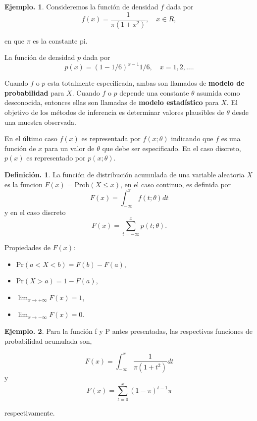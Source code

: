 \documentclass[]{book}
\providecommand{\tightlist}{%
  \setlength{\itemsep}{0pt}\setlength{\parskip}{0pt}}
\theoremstyle{definition}
\newtheorem{definition}{Definición.}[chapter]
\theoremstyle{definition}
\newtheorem{example}{Ejemplo.}[chapter]
\theoremstyle{definition}
\theoremstyle{remark}
\begin{document}
\begin{example}
\protect\hypertarget{exm:unnamed-chunk-104}{}{\label{exm:unnamed-chunk-104} }
Consideremos la función de densidad \(f\) dada por
\[f(x)= \frac{1}{\pi(1+x^2)}, \quad x\in R, \]

en que \(\pi\) es la constante pi.

La función de densidad \(p\) dada por
\[p(x)=(1-1/6)^{x-1}1/6, \quad x=1,2,\ldots. \]
\end{example}

Cuando \(f\) o \(p\) esta totalmente especificada, ambas son
llamados de \textbf{modelo de probabilidad} para \(X\). Cuando \(f\) o
\(p\) depende una constante \(\theta\) asumida como
desconocida, entonces ellas son llamadas de \textbf{modelo
estadístico} para \(X\). El objetivo de los métodos de
inferencia es determinar valores plausibles de \(\theta\)
desde una muestra observada.

En el último caso \(f(x)\) es representada por
\(f(x;\theta)\) indicando que \(f\) es una función de \(x\)
para un valor de \(\theta\) que debe ser especificado. En el
caso discreto, \(p(x)\) es representado por \(p(x;\theta)\).

\begin{definition}
\protect\hypertarget{def:unnamed-chunk-105}{}{\label{def:unnamed-chunk-105} }
La función de distribución acumulada de una variable
aleatoria \(X\) es la funcion \(F(x)= \mbox{Prob}(X\leq x)\), en
el caso
continuo, es definida por
\[ F(x)= \int_{-\infty}^x f(t;\theta)dt \]
y en el caso discreto
\[ F(x)=\sum_{t=-\infty}^{x}p(t;\theta).\]

Propiedades de \(F(x)\):

\begin{itemize}
\tightlist
\item
  Pr\((a<X<b) = F(b)- F(a)\),
\item
  Pr\((X>a) = 1- F(a)\),
\item
  \(\lim_{x\to + \infty}F(x) =1\),\\
\item
  \(\lim_{x\to - \infty}F(x)=0\).
\end{itemize}
\end{definition}

\begin{example}
\protect\hypertarget{exm:unnamed-chunk-106}{}{\label{exm:unnamed-chunk-106} }Para la función f y P antes presentadas, las respectivas funciones de
probabilidad acumulada son,

\[F(x)= \int_{-\infty}^{x} \frac{1}{\pi(1+t^2)} dt \]
y
\[ F(x)= \sum_{t= 0}^{x} (1-\pi)^{t-1}\pi  \]

respectivamente.
\end{example}
\end{document}
